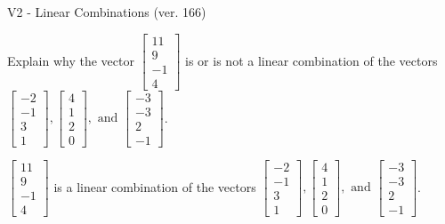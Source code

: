 \begin{exercise}
  \begin{exerciseTitle}V2 - Linear Combinations (ver. 166)\end{exerciseTitle}
  \begin{exerciseStatement}
    Explain why the vector \(\left[\begin{array}{c}
11 \\
9 \\
-1 \\
4
\end{array}\right]\)  is or is not a linear 
	combination of the vectors \(\left[\begin{array}{c}
-2 \\
-1 \\
3 \\
1
\end{array}\right] , \left[\begin{array}{c}
4 \\
1 \\
2 \\
0
\end{array}\right] , \text{ and } \left[\begin{array}{c}
-3 \\
-3 \\
2 \\
-1
\end{array}\right]\).
	


  \end{exerciseStatement}
  \begin{exerciseAnswer}
   \(\left[\begin{array}{c}
11 \\
9 \\
-1 \\
4
\end{array}\right]\) 
  	 is  
	a linear combination of the vectors \(\left[\begin{array}{c}
-2 \\
-1 \\
3 \\
1
\end{array}\right] , \left[\begin{array}{c}
4 \\
1 \\
2 \\
0
\end{array}\right] , \text{ and } \left[\begin{array}{c}
-3 \\
-3 \\
2 \\
-1
\end{array}\right]\).

	
  


  \end{exerciseAnswer}
\end{exercise}